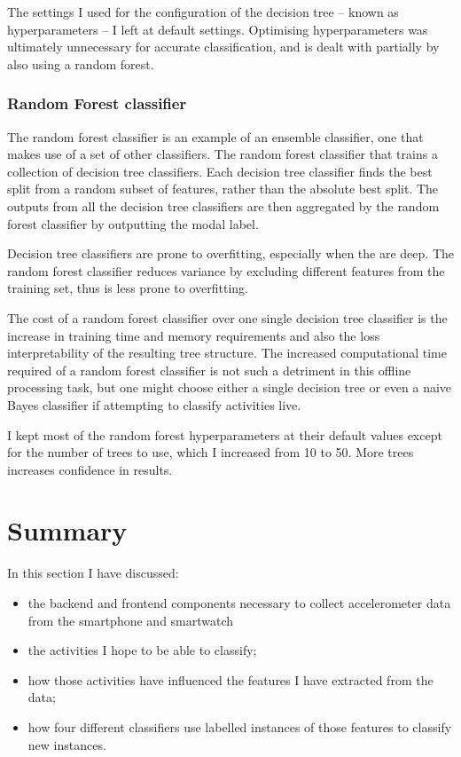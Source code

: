         The settings I used for the configuration of the decision tree -- known as hyperparameters -- I left at default settings. Optimising hyperparameters was ultimately unnecessary for accurate classification, and is dealt with partially by also using a random forest.
        
      \subsubsection{Random Forest classifier}
        The random forest classifier is an example of an ensemble classifier, one that makes use of a set of other classifiers. The random forest classifier that trains a collection of decision tree classifiers. Each decision tree classifier finds the best split from a random subset of features, rather than the absolute best split. The outputs from all the decision tree classifiers are then aggregated by the random forest classifier by outputting the modal label.
        
        Decision tree classifiers are prone to overfitting, especially when the are deep. The random forest classifier reduces variance by excluding different features from the training set, thus is less prone to overfitting.
        
        The cost of a random forest classifier over one single decision tree classifier is the increase in training time and memory requirements and also the loss interpretability of the resulting tree structure. The increased computational time required of a random forest classifier is not such a detriment in this offline processing task, but one might choose either a single decision tree or even a naive Bayes classifier if attempting to classify activities live.
        
        I kept most of the random forest hyperparameters at their default values except for the number of trees to use, which I increased from 10 to 50. More trees increases confidence in results.
  \section{Summary}
    In this section I have discussed:
    \begin{itemize}
      \item the backend and frontend components necessary to collect accelerometer data from the smartphone and smartwatch
      \item the activities I hope to be able to classify;
      \item how those activities have influenced the features I have extracted from the data;
      \item how four different classifiers use labelled instances of those features to classify new instances.
    \end{itemize}
